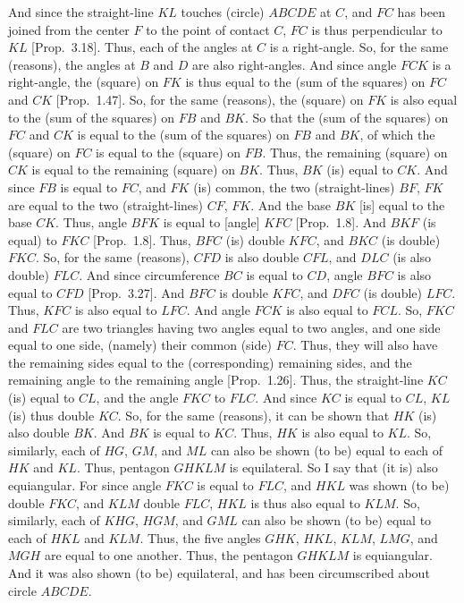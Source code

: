 And since the straight-line $KL$ touches (circle) $ABCDE$ at $C$, and $FC$ has been
joined from the center $F$ to the point of contact $C$, $FC$ is thus perpendicular 
to $KL$ [Prop.~3.18]. Thus, each of the angles
at $C$ is a right-angle. So, for the same (reasons), the angles at $B$ and $D$
are also right-angles. And since angle $FCK$ is a right-angle, the (square)
on $FK$ is thus equal to the (sum of the squares) on $FC$ and $CK$ [Prop.~1.47]. So, for the same (reasons), 
the (square) on $FK$ is also equal to the (sum of the squares) on $FB$ and $BK$.
So that the (sum of the squares) on $FC$ and $CK$ is equal to the (sum of the squares) on $FB$ and $BK$, of which the (square) on $FC$ is equal to the
(square) on $FB$. Thus, the remaining (square) on $CK$ is equal to
the remaining (square) on $BK$. Thus, $BK$ (is) equal to $CK$. And since
$FB$ is equal to $FC$, and $FK$ (is) common, the two (straight-lines)
$BF$, $FK$ are equal to the two (straight-lines) $CF$, $FK$. And the base $BK$
[is] equal to the base $CK$. Thus, angle $BFK$ is equal to [angle] $KFC$ 
[Prop.~1.8]. And $BKF$ (is equal) to $FKC$ [Prop.~1.8].
Thus, $BFC$ (is) double $KFC$,
and $BKC$ (is double) $FKC$. So, for the same (reasons), $CFD$ is also double
$CFL$, and $DLC$ (is also double) $FLC$. And since circumference $BC$
is equal  to $CD$, angle $BFC$ is also  equal  to $CFD$ [Prop.~3.27]. And $BFC$ is double $KFC$,
and $DFC$ (is double) $LFC$.  Thus, $KFC$ is also equal to $LFC$. 
And
angle $FCK$ is also equal to $FCL$. So, $FKC$ and $FLC$ are two triangles
having two angles equal to two angles, and one side equal to one side,
(namely) their common (side) $FC$. Thus, they will also have the
remaining sides equal to the (corresponding) remaining sides, and
the remaining angle to the remaining angle [Prop.~1.26]. Thus, the straight-line $KC$
(is) equal to $CL$, and the angle $FKC$ to $FLC$. And since $KC$ is
equal to $CL$, $KL$ (is) thus double $KC$. So, for the
same (reasons), it can be shown that $HK$ (is) also double $BK$. And
$BK$ is equal to $KC$. Thus, $HK$ is also equal to $KL$. So, similarly,  each of $HG$, $GM$, and $ML$ can also be shown (to be) equal to each of
$HK$ and $KL$. Thus, pentagon $GHKLM$ is equilateral. So I say that
(it is) also equiangular. For since angle $FKC$ is equal to $FLC$, 
and $HKL$ was shown (to be) double $FKC$, and $KLM$ double 
$FLC$, $HKL$ is thus also equal to $KLM$. So, similarly, each of $KHG$, $HGM$, and $GML$ can also be shown (to be) equal to each of
$HKL$ and $KLM$. Thus, the five angles $GHK$, $HKL$, $KLM$, $LMG$, and
$MGH$ are equal to one another. Thus, the pentagon $GHKLM$ is
equiangular. And it was also shown (to be) equilateral, and has been circumscribed 
about circle $ABCDE$.

